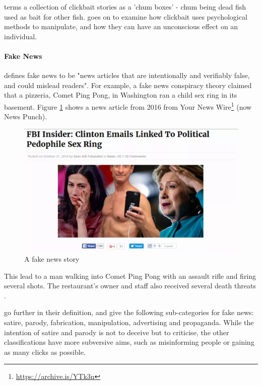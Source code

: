  terms a collection of clickbait stories as a 'chum boxes' - chum being dead fish used as bait for other fish. \citeauthor{mahoney2015} goes on to examine how clickbait uses psychological methods to manipulate, and how they can have an unconscious effect on an individual.

\paragraph{Fake News}
 defines fake news to be "news articles that are intentionally and verifiably false, and could mislead readers". For example, a fake news conspiracy theory claimed that a pizzeria, Comet Ping Pong, in Washington ran a child sex ring in its basement. Figure \ref{fig:fakenews} shows a news article from 2016 from Your News Wire\footnote{\url{https://archive.is/YTk3n}} (now News Punch).


\begin{figure}[ht!]
  \includegraphics[width=\linewidth]{images/fakenews.png}
  \caption{A fake news story}
  \label{fig:fakenews}
\end{figure}


This lead to a man walking into Comet Ping Pong with an assault rifle and firing several shots. The restaurant's owner and staff also received several death threats \cite{lopez2016}. 

\citeauthor{allcott2017} go further in their definition, and give the following sub-categories for fake news: satire, parody, fabrication, manipulation, advertising and propaganda. While the intention of satire and parody is not to deceive but to criticise, the other classifications have more subversive aims, such as misinforming people or gaining as many clicks as possible.

